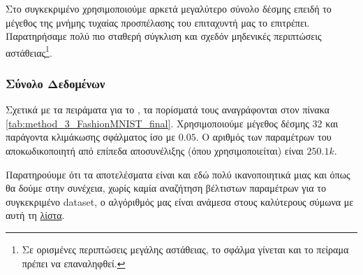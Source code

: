 Στο συγκεκριμένο  χρησιμοποιούμε αρκετά μεγαλύτερο σύνολο δέσμης επειδή το μέγεθος της μνήμης τυχαίας προσπέλασης του επιταχυντή μας το επιτρέπει. Παρατηρήσαμε πολύ πιο σταθερή σύγκλιση και σχεδόν μηδενικές περιπτώσεις αστάθειας\footnote{Σε ορισμένες περιπτώσεις μεγάλης αστάθειας, το σφάλμα γίνεται  και το πείραμα πρέπει να επαναληφθεί.}.

\subsubsection{Σύνολο Δεδομένων }

Σχετικά με τα πειράματα για το , τα πορίσματά τους αναγράφονται στον πίνακα \ref{tab:method_3_FashionMNIST_final}. Χρησιμοποιούμε μέγεθος δέσμης 32 και παράγοντα κλιμάκωσης σφάλματος ίσο με $0.05$. Ο αριθμός των παραμέτρων του αποκωδικοποιητή από επίπεδα αποσυνέλιξης (όπου χρησιμοποιείται) είναι $250.1k$.

\begin{table}[h]
    \begin{center}
    \end{center}
    \caption[]{\label{tab:method_3_FashionMNIST_final}Επίδωση των αλγορίθμων της μεθόδου 3 στο σύνολο δεδομένων , όταν χρησιμοποιούνται 30 εποχές για την εκπαίδευση του μοντέλου με μέγεθος δέσμης 32.} 
\end{table}

Παρατηρούυμε ότι τα αποτελέσματα είναι και εδώ πολύ ικανοποιητικά μιας και όπως θα δούμε στην συνέχεια, χωρίς καμία αναζήτηση βέλτιστων παραμέτρων για το συγκεκριμένο dataset, ο αλγόριθμός μας είναι ανάμεσα στους καλύτερους σύμωνα με αυτή τη \href{https://paperswithcode.com/sota/image-classification-on-fashion-mnist}{λίστα}.\par

